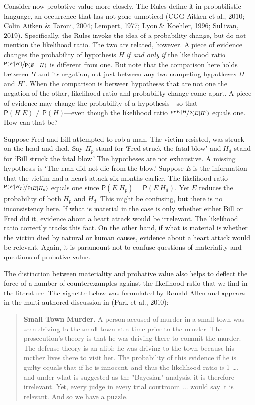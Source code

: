 \documentclass[
  letterpaper,
  DIV=11,
  numbers=noendperiod]{scrartcl}
\newcommand{\pr}[1]{\mathsf{P}(#1)}
\begin{document}
Consider now probative value more closely. The Rules define it in
probabilistic language, an occurrence that has not gone unnoticed (CGG
Aitken et al., 2010; Colin Aitken \& Taroni, 2004; Lempert, 1977; Lyon
\& Koehler, 1996; Sullivan, 2019). Specifically, the Rules invoke the
idea of a probability change, but do not mention the likelihood ratio.
The two are related, however. A piece of evidence changes the
probability of hypothesis \(H\) \textit{if and only if} the likelihood
ratio \(\nicefrac{\pr{E \vert H}}{\pr{E\vert \neg H}}\) is different
from one. But note that the comparison here holds between \(H\) and its
negation, not just between any two competing hypotheses \(H\) and
\(H'\). When the comparison is between hypotheses that are not one the
negation of the other, likelihood ratio and probability change come
apart. A piece of evidence may change the probability of a
hypothesis---so that \(\pr{H \vert E}\neq \pr{H}\)---even though the
likelihood ratio \(\nicefrac{pr{E \vert H}}{\pr{E\vert H'}}\) equals
one. How can that be?

Suppose Fred and Bill attempted to rob a man. The victim resisted, was
struck on the head and died. Say \(H_p\) stand for `Fred struck the
fatal blow' and \(H_d\) stand for `Bill struck the fatal blow.' The
hypotheses are not exhaustive. A missing hypothesis is `The man did not
die from the blow.' Suppose \(E\) is the information that the victim had
a heart attack six months earlier. The likelihood ratio
\(\nicefrac{\pr{E \vert H_p}}{\pr{E \vert H_d}}\) equals one since
\(\pr{E\vert H_p}=\pr{E\vert H_d}\). Yet \(E\) reduces the probability
of both \(H_p\) and \(H_d\). This might be confusing, but there is no
inconsistency here. If what is material in the case is only whether
either Bill or Fred did it, evidence about a heart attack would be
irrelevant. The likelihood ratio correctly tracks this fact. On the
other hand, if what is material is whether the victim died by natural or
human causes, evidence about a heart attack would be relevant. Again, it
is paramount not to confuse questions of materiality and questions of
probative value.

The distinction between materiality and probative value also helps to
deflect the force of a number of counterexamples against the likelihood
ratio that we find in the literature. The vignette below was formulated
by Ronald Allen and appears in the multi-authored discussion in (Park et
al., 2010):

\begin{quote}
    \textbf{Small Town Murder.} A person accused of murder in a small town was seen driving to the small town at a time prior to the murder. The prosecution's theory is that he was driving there to commit the murder. The defense theory is an alibi: he was driving to the town because his mother lives there to visit her. The probability of this evidence if he is guilty equals that if he is innocent, and thus the likelihood ratio is 1 \dots , and under what is suggested as the "Bayesian" analysis, it is therefore irrelevant. 
    Yet, every judge in every trial courtroom ... would say it is relevant.  And so we have a puzzle.  
    \end{quote}
\end{document}
